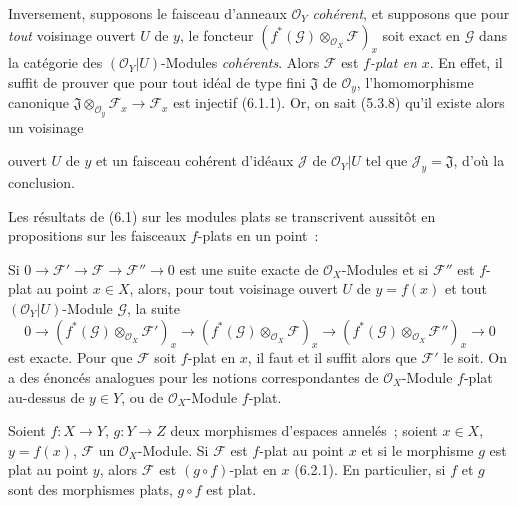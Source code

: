 \begin{env}[6.7.3]
\label{0.6.7.3-fr}
Inversement, supposons le faisceau d'anneaux $\mathcal O_Y$ \emph{cohérent}, et
supposons que pour \emph{tout} voisinage ouvert $U$ de $y$, le foncteur
$(f^*(\mathcal G)\otimes_{\mathcal O_X}\mathcal F)_x$ soit exact en
$\mathcal G$ dans la catégorie des $(\mathcal O_Y|U)$-Modules \emph{cohérents}.
Alors $\mathcal F$ est \emph{$f$-plat en $x$}. En effet, il suffit de prouver que
pour tout idéal de type fini $\mathfrak J$ de $\mathcal O_y$,
l'homomorphisme canonique
$\mathfrak J\otimes_{\mathcal O_y}\mathcal F_x\to\mathcal F_x$ est injectif
(6.1.1). Or, on sait (5.3.8) qu'il existe alors un voisinage


ouvert $U$ de $y$ et un faisceau cohérent d'idéaux $\mathcal J$ de
$\mathcal O_Y|U$ tel que $\mathcal J_y=\mathfrak J$, d'où la conclusion.
\end{env}

\begin{env}[6.7.4]
\label{0.6.7.4-fr}
Les résultats de (6.1) sur les modules plats se transcrivent aussitôt en
propositions sur les faisceaux $f$-plats en un point~:

Si $0\to\mathcal F'\to\mathcal F\to\mathcal F''\to0$ est une suite exacte
de $\mathcal O_X$-Modules et si $\mathcal F''$ est $f$-plat au point
$x\in X$, alors, pour tout voisinage ouvert $U$ de $y=f(x)$ et tout
$(\mathcal O_Y|U)$-Module $\mathcal G$, la suite
\[
  0\longrightarrow
  (f^*(\mathcal G)\otimes_{\mathcal O_X}\mathcal F')_x
  \longrightarrow
  (f^*(\mathcal G)\otimes_{\mathcal O_X}\mathcal F)_x
  \longrightarrow
  (f^*(\mathcal G)\otimes_{\mathcal O_X}\mathcal F'')_x
  \longrightarrow0
\]
est exacte. Pour que $\mathcal F$ soit $f$-plat en $x$, il faut et il suffit
alors que $\mathcal F'$ le soit. On a des énoncés analogues pour les notions
correspondantes de $\mathcal O_X$-Module $f$-plat au-dessus de $y\in Y$, ou
de $\mathcal O_X$-Module $f$-plat.
\end{env}

\begin{env}[6.7.5]
\label{0.6.7.5-fr}
Soient $f:X\to Y$, $g:Y\to Z$ deux morphismes d'espaces annelés~; soient
$x\in X$, $y=f(x)$, $\mathcal F$ un $\mathcal O_X$-Module. Si $\mathcal F$
est $f$-plat au point $x$ et si le morphisme $g$ est plat au point $y$, alors
$\mathcal F$ est $(g\circ f)$-plat en $x$ (6.2.1). En particulier, si $f$ et
$g$ sont des morphismes plats, $g\circ f$ est plat.
\end{env}

